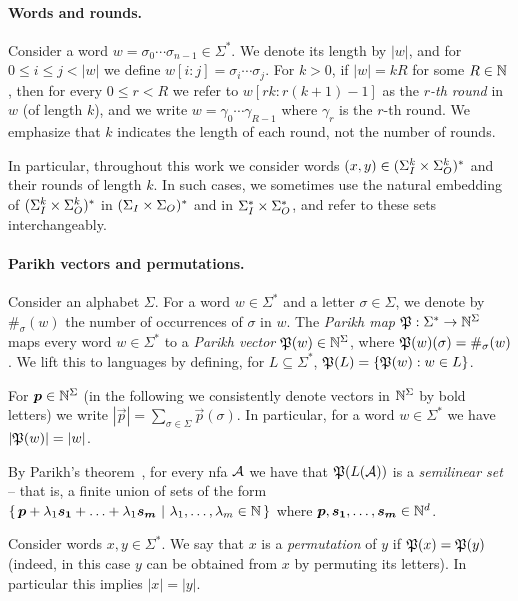 
\paragraph*{Words and rounds.}
Consider a word $w=\sigma_0\cdots \sigma_{n-1}\in \Sigma^*$. We denote its length by $|w|$, and for $0\le i\le j< |w|$ we define $w[i:j]=\sigma_i\cdots \sigma_j$. 
For $k>0$, if $|w|=kR$ for some $R\in \mathbb{N}$, then for every $0\le r<R$ we refer to $w[rk:r(k+1)-1]$ as the \emph{$r$-th round} in $w$ (of length $k$), and we write $w=\gamma_0\cdots \gamma_{R-1}$ where $\gamma_r$ is the $r$-th round. We emphasize that $k$ indicates the length of each round, not the number of rounds.

In particular, throughout this work we consider words $(x,y)\in (\Sigma_{I}^k\times \Sigma_{O}^k)^*$ and their rounds of length $k$. In such cases, we sometimes use the natural embedding of $(\Sigma_{I}^k\times \Sigma_{O}^k)^*$ in $(\Sigma_{I}\times \Sigma_{O})^*$ and in $\Sigma_{I}^*\times \Sigma_{O}^*$, and refer to these sets interchangeably.

\paragraph*{Parikh vectors and permutations.}
Consider an alphabet $\Sigma$. For a word $w\in \Sigma^*$ and a letter $\sigma\in \Sigma$, we denote by $\#_\sigma(w)$ the number of occurrences of $\sigma$ in $w$. 
The \emph{Parikh map}
$\mathfrak{P}:\Sigma^*\to \mathbb{N}^\Sigma$ maps every word $w\in \Sigma^*$ to a \emph{Parikh vector} $\mathfrak{P}(w)\in \mathbb{N}^\Sigma$, where $\mathfrak{P}(w)(\sigma)=\#_\sigma(w)$. We lift this to languages by defining, for $L\subseteq \Sigma^*$, $\mathfrak{P}(L)=\{\mathfrak{P}(w):w\in L\}$. 

For $\boldsymbol{p}\in \mathbb{N}^\Sigma$ (in the following we consistently denote vectors in $\mathbb{N}^\Sigma$ by bold letters) we write $|\vec{p}|=\sum_{\sigma\in \Sigma}\vec{p}(\sigma)$. In particular, for a word $w\in \Sigma^*$ we have $|\mathfrak{P}(w)|=|w|$.

By Parikh's theorem~\cite{Parikh1966}, for every \gls{nfa} $\mathcal{A}$ we have that $\mathfrak{P}(L(\mathcal{A}))$ is a \emph{semilinear set} -- that is, a finite union of sets of the form
$\left\{\,\boldsymbol{p}+\lambda_1 \boldsymbol{s_1}+\ldots+\lambda_1 \boldsymbol{s_m}\ \middle|\ \lambda_1,\ldots,\lambda_m\in \mathbb{N}\,\right\}$
where $\boldsymbol{p},\boldsymbol{s_1},\ldots,\boldsymbol{s_m}\in \mathbb{N}^d$.

Consider words $x,y\in \Sigma^*$. We say that $x$ is a \emph{permutation} of $y$ if $\mathfrak{P}(x)=\mathfrak{P}(y)$ (indeed, in this case $y$ can be obtained from $x$ by permuting its letters). In particular this implies $|x|=|y|$.
